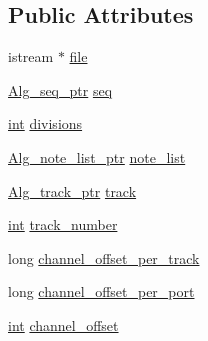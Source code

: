 \subsection*{Public Attributes}
\begin{DoxyCompactItemize}
\item 
istream $\ast$ \hyperlink{class_alg__midifile__reader_af1fd5dd8779e59babe39a3e97a01fb0c}{file}
\item 
\hyperlink{allegro_8h_aad5a663237745add3ab7fec40d5f2c87}{Alg\+\_\+seq\+\_\+ptr} \hyperlink{class_alg__midifile__reader_ab41a5bccce484cbc55cafe17c2fed722}{seq}
\item 
\hyperlink{xmltok_8h_a5a0d4a5641ce434f1d23533f2b2e6653}{int} \hyperlink{class_alg__midifile__reader_a659a655b260791aa665ad3e5785e32c9}{divisions}
\item 
\hyperlink{allegrosmfrd_8cpp_a806465c2d2ee17b0f7a62656c0344d7f}{Alg\+\_\+note\+\_\+list\+\_\+ptr} \hyperlink{class_alg__midifile__reader_ac86885717955ca45865b7411d32d8070}{note\+\_\+list}
\item 
\hyperlink{allegro_8h_a4a72ca46459ff96c43e76567e345d0e0}{Alg\+\_\+track\+\_\+ptr} \hyperlink{class_alg__midifile__reader_acdb63534e6db45a1bddc2a908c2e8acf}{track}
\item 
\hyperlink{xmltok_8h_a5a0d4a5641ce434f1d23533f2b2e6653}{int} \hyperlink{class_alg__midifile__reader_a9f78c142dec2238678aab094d6aeebda}{track\+\_\+number}
\item 
long \hyperlink{class_alg__midifile__reader_a38df5c4ca804c06648900ea9a3b598da}{channel\+\_\+offset\+\_\+per\+\_\+track}
\item 
long \hyperlink{class_alg__midifile__reader_a169548968bc5831736fa7417f25ec73f}{channel\+\_\+offset\+\_\+per\+\_\+port}
\item 
\hyperlink{xmltok_8h_a5a0d4a5641ce434f1d23533f2b2e6653}{int} \hyperlink{class_alg__midifile__reader_a3356d6d7e64bd78b4ab8a63a844ba999}{channel\+\_\+offset}
\end{DoxyCompactItemize}
